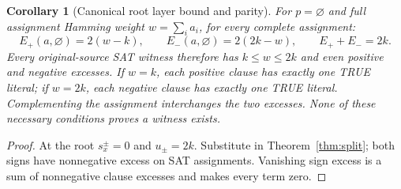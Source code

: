 \documentclass[11pt]{article}
\newtheorem{corollary}{Corollary}
\begin{document}
\begin{corollary}[Canonical root layer bound and parity]\label{cor:root}
For $p=\varnothing$ and full assignment Hamming weight $w=\sum_i a_i$, for \emph{every} complete assignment:
\[
E_+(a,\varnothing)=2(w-k),\qquad E_-(a,\varnothing)=2(2k-w),\qquad E_++E_-=2k.
\]
Every original-source SAT witness therefore has $k\le w\le2k$ and \emph{even} positive and negative excesses. If $w=k$, each positive clause has exactly one TRUE literal; if $w=2k$, each negative clause has exactly one TRUE literal. Complementing the assignment interchanges the two excesses. None of these necessary conditions proves a witness exists.
\end{corollary}
\begin{proof}
At the root $s_x^\pm=0$ and $u_\pm=2k$. Substitute in Theorem~\ref{thm:split}; both signs have nonnegative excess on SAT assignments. Vanishing sign excess is a sum of nonnegative clause excesses and makes every term zero.
\end{proof}
\end{document}
